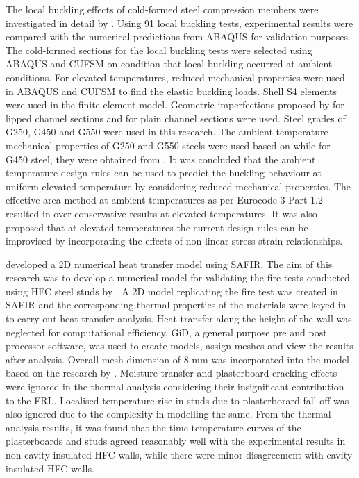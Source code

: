 The local buckling effects of cold-formed steel compression members were investigated in detail by \citet{Gunalan2015}. Using 91 local buckling tests, experimental results were compared with the numerical predictions from ABAQUS for validation purposes. The cold-formed sections for the local buckling tests were selected using ABAQUS and CUFSM on condition that local buckling occurred at ambient conditions. For elevated temperatures, reduced mechanical properties were used in ABAQUS and CUFSM to find the elastic buckling loads. Shell S4 elements were used in the finite element model. Geometric imperfections proposed by \citet{Schafer2010} for lipped channel sections and \citet{Camotim2006} for plain channel sections were used. Steel grades of G250, G450 and G550 were used in this research. The ambient temperature mechanical properties of G250 and G550 steels were used based on \citet{Ranawaka2009a} while for G450 steel, they were obtained from \citet{Kankanamge2011}. It was concluded that the ambient temperature design rules can be used to predict the buckling behaviour at uniform elevated temperature by considering reduced mechanical properties. The effective area method at ambient temperatures as per Eurocode 3 Part 1.2 resulted in over-conservative results at elevated temperatures. It was also proposed that at elevated temperatures the current design rules can be improvised by incorporating the effects of non-linear stress-strain relationships.

\citet{Kesawan2015a} developed a 2D numerical heat transfer model using SAFIR. The aim of this research was to develop a numerical model for validating the fire tests conducted using HFC steel studs by \citet{Kesawan2015}. A 2D model replicating the fire test was created in SAFIR and the corresponding thermal properties of the materials were keyed in to carry out heat transfer analysis. Heat transfer along the height of the wall was neglected for computational efficiency. GiD, a general purpose pre and post processor software, was used to create models, assign meshes and view the results after analysis. Overall mesh dimension of 8 mm was incorporated into the model based on the research by \citet{Keerthan2012}. Moisture transfer and plasterboard cracking effects were ignored in the thermal analysis considering their insignificant contribution to the FRL. Localised temperature rise in studs due to plasterborard fall-off was also ignored due to the complexity in modelling the same. From the thermal analysis results, it was found that the time-temperature curves of the plasterboards and studs agreed reasonably well with the experimental results in non-cavity insulated HFC walls, while there were minor disagreement with cavity insulated HFC walls. 

